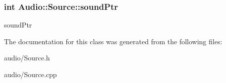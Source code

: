\subsubsection[{\texorpdfstring{sound\+Ptr}{soundPtr}}]{\setlength{\rightskip}{0pt plus 5cm}int Audio\+::\+Source\+::sound\+Ptr}\hypertarget{classAudio_1_1Source_a5382b8eba7691dfd979af332789c6de4}{}\label{classAudio_1_1Source_a5382b8eba7691dfd979af332789c6de4}
sound\+Ptr 

The documentation for this class was generated from the following files\+:\begin{DoxyCompactItemize}
\item 
audio/Source.\+h\item 
audio/Source.\+cpp\end{DoxyCompactItemize}
